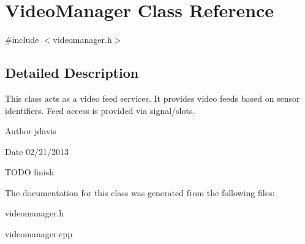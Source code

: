 \hypertarget{classVideoManager}{\section{Video\-Manager Class Reference}
\label{classVideoManager}
}


{\ttfamily \#include $<$videomanager.\-h$>$}



\subsection{Detailed Description}
This class acts as a video feed services. It provides video feeds based on sensor identifiers. Feed access is provided via signal/slots.

\begin{DoxyAuthor}{Author}
jdavis 
\end{DoxyAuthor}
\begin{DoxyDate}{Date}
02/21/2013
\end{DoxyDate}
T\-O\-D\-O finish 

The documentation for this class was generated from the following files\-:\begin{DoxyCompactItemize}
\item 
videomanager.\-h\item 
videomanager.\-cpp\end{DoxyCompactItemize}
